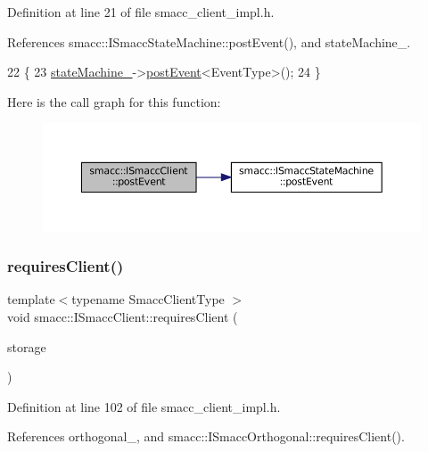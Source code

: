 Definition at line 21 of file smacc\+\_\+client\+\_\+impl.\+h.



References smacc\+::\+I\+Smacc\+State\+Machine\+::post\+Event(), and state\+Machine\+\_\+.


\begin{DoxyCode}
22     \{
23         \hyperlink{classsmacc_1_1ISmaccClient_a926e4f2ae796def63d48dca389a48c47}{stateMachine\_}->\hyperlink{classsmacc_1_1ISmaccStateMachine_afcb6a216441aeaea2cba4e1ab12c366b}{postEvent}<EventType>();
24     \}
\end{DoxyCode}
Here is the call graph for this function\+:
\nopagebreak
\begin{figure}[H]
\begin{center}
\leavevmode
\includegraphics[width=350pt]{classsmacc_1_1ISmaccClient_a21a79203cb44fc717d4d977c190327c6_cgraph}
\end{center}
\end{figure}
\mbox{\label{classsmacc_1_1ISmaccClient_a7a9990a2f3e35d547671188d69fee520}} 
\subsubsection{\texorpdfstring{requires\+Client()}{requiresClient()}}
{\footnotesize\ttfamily template$<$typename Smacc\+Client\+Type $>$ \\
void smacc\+::\+I\+Smacc\+Client\+::requires\+Client (\begin{DoxyParamCaption}\item[{Smacc\+Client\+Type $\ast$\&}]{storage }\end{DoxyParamCaption})}



Definition at line 102 of file smacc\+\_\+client\+\_\+impl.\+h.



References orthogonal\+\_\+, and smacc\+::\+I\+Smacc\+Orthogonal\+::requires\+Client().



